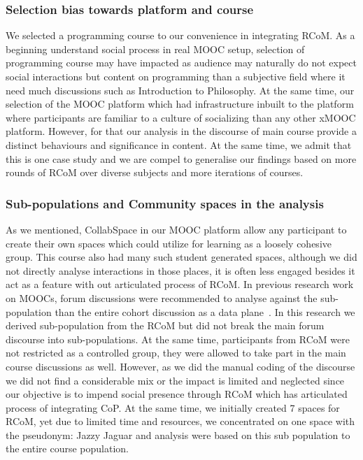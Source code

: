 \documentclass[format=acmsmall, review=false, screen=true]{acmart}
\begin{document}
\subsubsection{Selection bias towards platform and course} 
We selected a programming course to our convenience in integrating RCoM. As a beginning understand social process in real MOOC setup, selection of programming course may have impacted as audience may naturally do not expect social interactions but content on programming than a subjective field where it need much discussions such as Introduction to Philosophy. At the same time, our selection of the MOOC platform which had infrastructure inbuilt to the platform where participants are familiar to a culture of socializing than any other xMOOC platform. However, for that our analysis in the discourse of main course provide a distinct behaviours and significance in content. At the same time, we admit that this is one case study and we are compel to generalise our findings based on more rounds of RCoM over diverse subjects and more iterations of courses. 

\subsubsection{Sub-populations and Community spaces in the analysis}
As we mentioned, CollabSpace in our MOOC platform allow any participant to create their own spaces which could utilize for learning as a loosely cohesive group. This course also had many such student generated spaces, although we did not directly analyse interactions in those places, it is often less engaged besides it act as a feature with out articulated process of RCoM. 
In previous research work on MOOCs, forum discussions were recommended to analyse against the sub-population than the entire cohort discussion as a data plane~\cite{poquet2018social}. In this research we derived sub-population from the RCoM but did not break the main forum discourse into sub-populations. At the same time, participants from RCoM were not restricted as a controlled group, they were allowed to take part in the main course discussions as well. However, as we did the manual coding of the discourse we did not find a considerable mix or the impact is limited and neglected since our objective is to impend social presence through RCoM which has articulated process of integrating CoP. At the same time, we initially created 7 spaces for RCoM, yet due to limited time and resources, we concentrated on one space with the pseudonym: Jazzy Jaguar and analysis were based on this sub population to the entire course population. 
\end{document}
